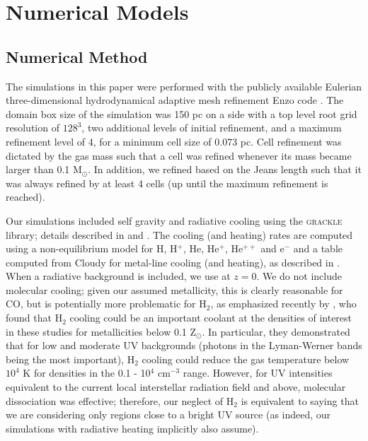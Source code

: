 \documentclass[useAMS,usenatbib]{mn2e}
\begin{document}
%
\section{Numerical Models}
\label{sec:numerical}
\subsection{Numerical Method}

The simulations in this paper were performed with the publicly available Eulerian three-dimensional
hydrodynamical adaptive mesh refinement Enzo code \citep{Bryan2014}. The domain
box size of the simulation was 150 pc on a side with a top level root grid resolution of $128^3$, two
additional levels of initial refinement, and a maximum refinement level of 4, for a minimum cell size of 0.073 pc.  Cell refinement was dictated 
by the gas mass such that a cell was refined whenever its mass became larger than 0.1 M$_\odot$.
In addition, we refined based on the Jeans length such that it was always refined by at least 4 cells (up until
the maximum refinement is reached).

Our simulations included self gravity and radiative cooling using the
\textsc{grackle} library; details described in \cite{Bryan2014} and \cite{Smith2016}. The cooling (and
heating) rates are computed using a non-equilibrium model for H, H$^+$, He, He$^+$, He$^{++}$ and e$^-$
and a table computed from Cloudy for metal-line cooling (and heating), as described in \citet{Smith2016}.
When a radiative background is included, we use \cite{Haardt2012} at $z=0$.  We do not include molecular
cooling; given our assumed metallicity, this is clearly reasonable for CO, but is potentially more problematic
for H$_2$, as emphasized recently by \citet{Glover2014}, who found that H$_2$ cooling could be an important
coolant at the densities of interest in these studies for metallicities below 0.1 Z$_\odot$.  In particular, they
demonstrated that for low and moderate UV backgrounds (photons in the Lyman-Werner bands being the
most important), H$_2$ cooling could reduce the gas temperature below $10^4$ K for densities in the 0.1 - 10$^4$ 
cm$^{-3}$ range.  However, for UV intensities equivalent to the current local interstellar radiation field and above,
molecular dissociation was effective; therefore, our neglect of H$_2$ is equivalent to saying that we are
considering only regions close to a bright UV source (as indeed, our simulations with radiative heating
implicitly also assume).
\end{document}
